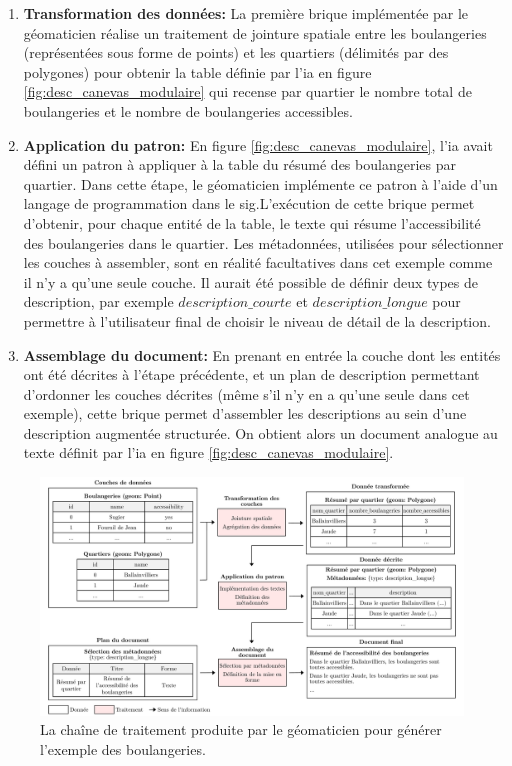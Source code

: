 \begin{enumerate}
    \item \textbf{Transformation des données:} La première brique implémentée par le géomaticien réalise un traitement de jointure spatiale entre les boulangeries (représentées sous forme de points) et les quartiers (délimités par des polygones) pour obtenir la table définie par l'\gls{ia} en figure \ref{fig:desc_canevas_modulaire} qui recense par quartier le nombre total de boulangeries et le nombre de boulangeries accessibles.
    \item \textbf{Application du patron:} En figure \ref{fig:desc_canevas_modulaire}, l'\gls{ia} avait défini un patron à appliquer à la table du résumé des boulangeries par quartier. Dans cette étape, le géomaticien implémente ce patron à l'aide d'un langage de programmation dans le \gls{sig}.L'exécution de cette brique permet d'obtenir, pour chaque entité de la table, le texte qui résume l'accessibilité des boulangeries dans le quartier. Les métadonnées, utilisées pour sélectionner les couches à assembler, sont en réalité facultatives dans cet exemple comme il n'y a qu'une seule couche. Il aurait été possible de définir deux types de description, par exemple $description\_courte$ et $description\_longue$ pour permettre à l'utilisateur final de choisir le niveau de détail de la description.
    \item \textbf{Assemblage du document:} En prenant en entrée la couche dont les entités ont été décrites à l'étape précédente, et un plan de description permettant d'ordonner les couches décrites (même s'il n'y en a qu'une seule dans cet exemple), cette brique permet d'assembler les descriptions au sein d'une description augmentée structurée. On obtient alors un document analogue au texte définit par l'\gls{ia} en figure \ref{fig:desc_canevas_modulaire}.
\end{enumerate}

\begin{figure}[ht]
    \centering
    \includegraphics[width=\textwidth]{images/description/exemple_chaine.pdf}
    \caption[Chaîne de traitement de réalisation de description]{La chaîne de traitement produite par le géomaticien pour générer l'exemple des boulangeries.}
    \label{fig:desc_chaine_sig}
\end{figure}

